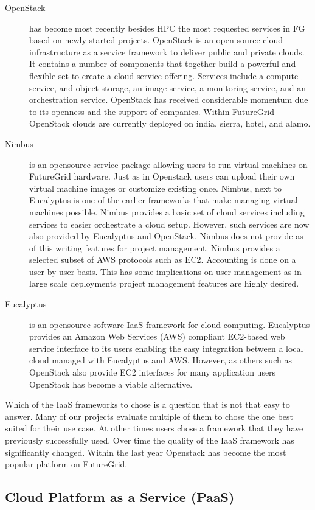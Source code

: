 \begin{description}
\item [OpenStack] has become most recently besides HPC the most requested services in FG based on newly started projects. OpenStack is an open source cloud infrastructure as a service framework to deliver public and private clouds. It contains a number of components that together build a powerful and flexible set to create a cloud service offering. Services include a compute service, and object storage, an image service, a monitoring service, and an orchestration service. OpenStack has received considerable momentum due to its openness and the support of companies. Within FutureGrid OpenStack clouds are currently deployed on india, sierra, hotel, and alamo.  

\item [Nimbus] is an opensource service package allowing users to run virtual machines on FutureGrid hardware. Just as in Openstack users can upload their own virtual machine images or customize existing once. Nimbus, next to Eucalyptus is one of the earlier frameworks that make managing virtual machines possible. Nimbus provides a basic set of cloud services including services to easier orchestrate a cloud setup. However, such services are now also provided by Eucalyptus and OpenStack. Nimbus does not provide as of this writing features for project management. Nimbus provides a selected subset of AWS protocols such as EC2. Accounting is done on a user-by-user basis. This has some implications on user management as in large scale deployments project management features are highly desired.

\item [Eucalyptus] is an opensource software IaaS framework for cloud computing. Eucalyptus provides an Amazon Web Services (AWS) compliant EC2-based web service interface to its users enabling the easy integration between a local cloud managed with Eucalyptus and AWS. However, as others such as OpenStack also provide EC2 interfaces for many application users OpenStack has become a viable alternative.

\end{description}

Which of the IaaS frameworks to chose is a question that is not that easy to answer. Many of our projects evaluate multiple of them to chose the one best suited for their use case. At other times users chose a framework that they have previously successfully used. Over time the quality of the IaaS framework has significantly changed. Within the last year Openstack has become the most popular  platform on FutureGrid.


\subsection{Cloud Platform as a Service (PaaS)}



